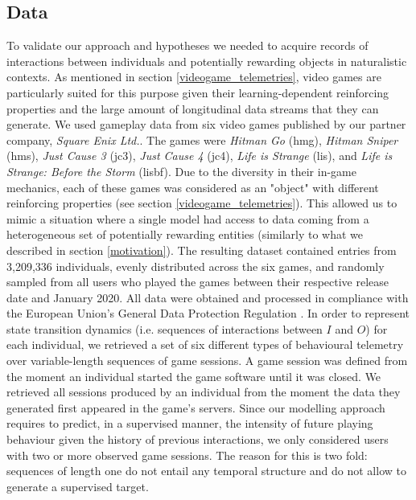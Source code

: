 

\subsection{Data}
To validate our approach and hypotheses we needed to acquire records of interactions between individuals and potentially rewarding objects in naturalistic contexts. As mentioned in section \ref{videogame_telemetries}, video games are particularly suited for this purpose given their learning-dependent reinforcing properties and the large amount of longitudinal data streams that they can generate. We used gameplay data from  six video games published by our partner company, \textit{Square Enix Ltd.}. The games were \emph{Hitman Go} (hmg), \emph{Hitman Sniper} (hms), \emph{Just Cause 3} (jc3), \emph{Just Cause 4} (jc4), \emph{Life is Strange} (lis), and \emph{Life is Strange: Before the Storm} (lisbf). Due to the diversity in their in-game mechanics, each of these games was considered as an "object" with different reinforcing properties (see section \ref{videogame_telemetries}). This allowed us to mimic a situation where a single model had access to data coming from a heterogeneous set of potentially rewarding entities (similarly to what we described in section \ref{motivation}). The resulting dataset contained entries from 3,209,336 individuals, evenly distributed across the six games, and randomly sampled from all users who played the games between their respective release date and January 2020. All data were obtained and processed in compliance with the European Union's General Data Protection Regulation \cite{EUdataregulations2018}. In order to represent state transition dynamics (i.e. sequences of interactions between $I$ and $O$) for each individual, we retrieved a set of six different types of behavioural telemetry over variable-length sequences of game sessions. A game session was defined from the moment an individual started the game software until it was closed. We retrieved all sessions produced by an individual from the moment the data they generated first appeared in the game's servers. Since our modelling approach requires to predict, in a supervised manner, the intensity of future playing behaviour given the history of previous interactions, we only considered users with two or more observed game sessions. The reason for this is two fold: sequences of length one do not entail any temporal structure and do not allow to generate a supervised target.

